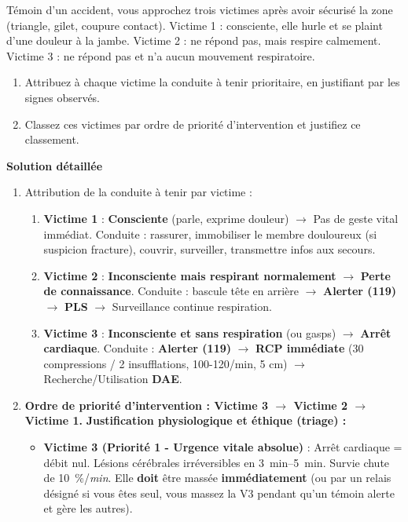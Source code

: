 \documentclass[11pt]{article}
\begin{document}
\begin{exoresolu}
Témoin d'un accident, vous approchez trois victimes après avoir sécurisé la zone (triangle, gilet, coupure contact). Victime 1 : consciente, elle hurle et se plaint d'une douleur à la jambe. Victime 2 : ne répond pas, mais respire calmement. Victime 3 : ne répond pas et n'a aucun mouvement respiratoire.
\begin{enumerate}
\item Attribuez à chaque victime la conduite à tenir prioritaire, en justifiant par les signes observés.
\item Classez ces victimes par ordre de priorité d'intervention et justifiez ce classement.
\end{enumerate}
\tcblower
\textbf{Solution détaillée}
\begin{enumerate}
\item Attribution de la conduite à tenir par victime :
\begin{enumerate}
\item \textbf{Victime 1} : \textbf{Consciente} (parle, exprime douleur) $\rightarrow$ Pas de geste vital immédiat. Conduite : rassurer, immobiliser le membre douloureux (si suspicion fracture), couvrir, surveiller, transmettre infos aux secours.
\item \textbf{Victime 2} : \textbf{Inconsciente mais respirant normalement} $\rightarrow$ \textbf{Perte de connaissance}. Conduite : bascule tête en arrière $\rightarrow$ \textbf{Alerter (119)} $\rightarrow$ \textbf{PLS} $\rightarrow$ Surveillance continue respiration.
\item \textbf{Victime 3} : \textbf{Inconsciente et sans respiration} (ou gasps) $\rightarrow$ \textbf{Arrêt cardiaque}. Conduite : \textbf{Alerter (119)} $\rightarrow$ \textbf{RCP immédiate} (30 compressions / 2 insufflations, 100-120/min, 5 cm) $\rightarrow$ Recherche/Utilisation \textbf{DAE}.
\end{enumerate}
\item \textbf{Ordre de priorité d'intervention : Victime 3 $\rightarrow$ Victime 2 $\rightarrow$ Victime 1.}
\textbf{Justification physiologique et éthique (triage) :}
\begin{itemize}
\item \textbf{Victime 3 (Priorité 1 - Urgence vitale absolue)} : Arrêt cardiaque = débit nul. Lésions cérébrales irréversibles en \SIrange{3}{5}{min}. Survie chute de \SI{10}{\%}/\textit{min}. Elle \textbf{doit} être massée \textbf{immédiatement} (ou par un relais désigné si vous êtes seul, vous massez la V3 pendant qu'un témoin alerte et gère les autres).

\end{itemize}
\end{enumerate}
\end{exoresolu}
\end{document}
